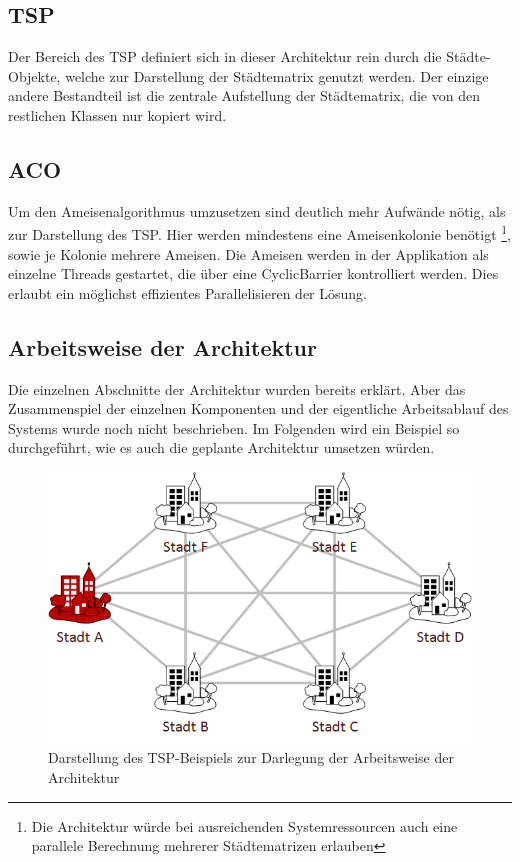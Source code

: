 {	\subsection{TSP}
	Der Bereich des TSP definiert sich in dieser Architektur rein durch die Städte-Objekte, welche zur Darstellung der Städtematrix genutzt werden. Der einzige andere Bestandteil ist die zentrale Aufstellung der Städtematrix, die von den restlichen Klassen nur kopiert wird.
	
	\subsection{ACO}
	Um den Ameisenalgorithmus umzusetzen sind deutlich mehr Aufwände nötig, als zur Darstellung des TSP. Hier werden mindestens eine Ameisenkolonie benötigt \footnote{Die Architektur würde bei ausreichenden Systemressourcen auch eine parallele Berechnung mehrerer Städtematrizen erlauben},
	sowie je Kolonie mehrere Ameisen.
	\newline
	Die Ameisen werden in der Applikation als einzelne Threads gestartet, die über eine CyclicBarrier kontrolliert werden. Dies erlaubt ein möglichst effizientes Parallelisieren der Lösung.
	
	\subsection{Arbeitsweise der Architektur}
	Die einzelnen Abschnitte der Architektur wurden bereits erklärt. Aber das Zusammenspiel der einzelnen Komponenten und der eigentliche Arbeitsablauf des Systems wurde noch nicht beschrieben. Im Folgenden wird ein Beispiel so durchgeführt, wie es auch die geplante Architektur umsetzen würden.
	\begin{figure}[h]
		\centering
		\includegraphics[width=0.9\linewidth]{images/TSP_ACO_numerisch.png}
		\caption{Darstellung des TSP-Beispiels zur Darlegung der Arbeitsweise der Architektur}
		\label{tspAcoNumerisch}
	\end{figure}
}